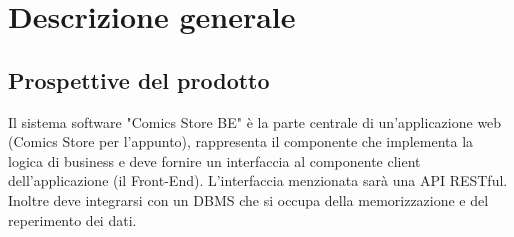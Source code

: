 \documentclass{scrreprt}
\begin{document}
\chapter{Descrizione generale}

\section{Prospettive del prodotto}
Il sistema software "Comics Store BE" è la parte centrale di un'applicazione web (Comics Store per l'appunto),
rappresenta il componente che implementa la logica di business e deve fornire un interfaccia al componente client
dell'applicazione (il Front-End). L'interfaccia menzionata sarà una API RESTful.
Inoltre deve integrarsi con un DBMS che si occupa della memorizzazione e del reperimento dei dati.
\end{document}
